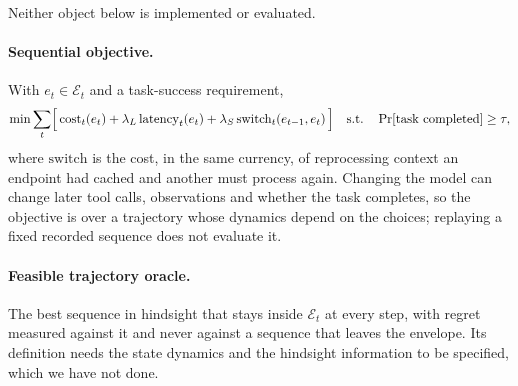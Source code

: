 \documentclass[11pt]{article}
\newcommand{\E}{\mathcal{E}}
\begin{document}
Neither object below is implemented or evaluated.

\paragraph{Sequential objective.} With $e_t \in \E_t$ and a
task-success requirement,
\begin{equation}
  \min \sum_t \Bigl[\, \mathrm{cost}_t(e_t) + \lambda_L\, \mathrm{latency}_t(e_t)
    + \lambda_S\, \mathrm{switch}_t(e_{t-1}, e_t) \,\Bigr]
  \quad \text{s.t.} \quad \Pr[\text{task completed}] \ge \tau,
\end{equation}
where $\mathrm{switch}$ is the cost, in the same currency, of reprocessing context an endpoint
had cached and another must process again. Changing the model can change later tool calls,
observations and whether the task completes, so the objective is over a trajectory whose
dynamics depend on the choices; replaying a fixed recorded sequence does not evaluate it.

\paragraph{Feasible trajectory oracle.} The best sequence in hindsight that stays
inside $\E_t$ at every step, with regret measured against it and never against a sequence that
leaves the envelope. Its definition needs the state dynamics and the hindsight information to be
specified, which we have not done.
\end{document}
